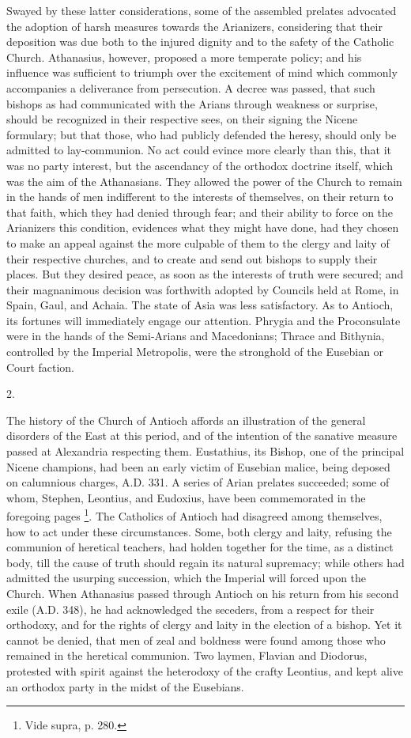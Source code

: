 Swayed by these latter considerations, some of the assembled
prelates advocated the adoption of harsh measures towards the
Arianizers, considering that their deposition was due both to the
injured dignity and to the safety of the Catholic Church. Athanasius,
however, proposed a more temperate policy; and his influence was
sufficient to triumph over the excitement of mind which commonly
accompanies a deliverance from persecution. A decree was passed, that
such bishops as had communicated with the Arians through weakness or
surprise, should be recognized in their respective sees, on their
signing the Nicene formulary; but that those, who had publicly
defended the heresy, should only be admitted to lay-communion. No act
could evince more clearly than this, that it was no party interest,
but the ascendancy of the orthodox doctrine itself, which was the aim
of the Athanasians. They allowed the power of the Church to remain in
the hands of men indifferent to the interests of themselves, on their
return to that faith, which they had denied through fear; and their
ability to force on the Arianizers this condition, evidences what they
might have done, had they chosen to make an appeal against the more
culpable of them to the clergy and laity of their respective churches,
and to create and send out bishops to supply their places. But they
desired peace, as soon as the interests of truth were secured; and
their magnanimous decision was forthwith adopted by Councils
held at Rome, in Spain, Gaul, and Achaia. The state of Asia was less
satisfactory. As to Antioch, its fortunes will immediately engage our
attention. Phrygia and the Proconsulate were in the hands of the
Semi-Arians and Macedonians; Thrace and Bithynia, controlled by the
Imperial Metropolis, were the stronghold of the Eusebian or Court
faction.

2.

The history of the Church of Antioch affords an illustration of the
general disorders of the East at this period, and of the intention of
the sanative measure passed at Alexandria respecting them. Eustathius,
its Bishop, one of the principal Nicene champions, had been an early
victim of Eusebian malice, being deposed on calumnious charges, A.D.
331. A series of Arian prelates succeeded; some of whom, Stephen,
Leontius, and Eudoxius, have been commemorated in the foregoing pages
\footnote{Vide supra, p. 280.}. The Catholics of Antioch
had disagreed among themselves, how to act under these circumstances.
Some, both clergy and laity, refusing the communion of heretical
teachers, had holden together for the time, as a distinct body, till
the cause of truth should regain its natural supremacy; while others
had admitted the usurping succession, which the Imperial will forced
upon the Church. When Athanasius passed through Antioch on his return
from his second exile (A.D. 348), he had
acknowledged the seceders, from a respect for their orthodoxy, and for
the rights of clergy and laity in the election of a bishop. Yet it
cannot be denied, that men of zeal and boldness were found among those
who remained in the heretical communion. Two laymen, Flavian and
Diodorus, protested with spirit against the heterodoxy of the crafty
Leontius, and kept alive an orthodox party in the midst of the
Eusebians.

